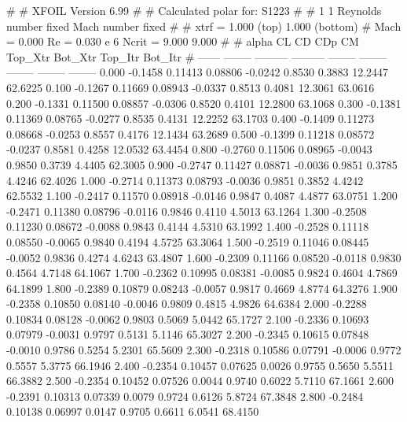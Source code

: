 #  
#       XFOIL         Version 6.99
#  
# Calculated polar for: S1223                                           
#  
# 1 1 Reynolds number fixed          Mach number fixed         
#  
# xtrf =   1.000 (top)        1.000 (bottom)  
# Mach =   0.000     Re =     0.030 e 6     Ncrit =   9.000  9.000
#  
#   alpha    CL        CD       CDp       CM     Top_Xtr  Bot_Xtr  Top_Itr  Bot_Itr
#  ------ -------- --------- --------- -------- -------- -------- -------- --------
   0.000  -0.1458   0.11413   0.08806  -0.0242   0.8530   0.3883  12.2447  62.6225
   0.100  -0.1267   0.11669   0.08943  -0.0337   0.8513   0.4081  12.3061  63.0616
   0.200  -0.1331   0.11500   0.08857  -0.0306   0.8520   0.4101  12.2800  63.1068
   0.300  -0.1381   0.11369   0.08765  -0.0277   0.8535   0.4131  12.2252  63.1703
   0.400  -0.1409   0.11273   0.08668  -0.0253   0.8557   0.4176  12.1434  63.2689
   0.500  -0.1399   0.11218   0.08572  -0.0237   0.8581   0.4258  12.0532  63.4454
   0.800  -0.2760   0.11506   0.08965  -0.0043   0.9850   0.3739   4.4405  62.3005
   0.900  -0.2747   0.11427   0.08871  -0.0036   0.9851   0.3785   4.4246  62.4026
   1.000  -0.2714   0.11373   0.08793  -0.0036   0.9851   0.3852   4.4242  62.5532
   1.100  -0.2417   0.11570   0.08918  -0.0146   0.9847   0.4087   4.4877  63.0751
   1.200  -0.2471   0.11380   0.08796  -0.0116   0.9846   0.4110   4.5013  63.1264
   1.300  -0.2508   0.11230   0.08672  -0.0088   0.9843   0.4144   4.5310  63.1992
   1.400  -0.2528   0.11118   0.08550  -0.0065   0.9840   0.4194   4.5725  63.3064
   1.500  -0.2519   0.11046   0.08445  -0.0052   0.9836   0.4274   4.6243  63.4807
   1.600  -0.2309   0.11166   0.08520  -0.0118   0.9830   0.4564   4.7148  64.1067
   1.700  -0.2362   0.10995   0.08381  -0.0085   0.9824   0.4604   4.7869  64.1899
   1.800  -0.2389   0.10879   0.08243  -0.0057   0.9817   0.4669   4.8774  64.3276
   1.900  -0.2358   0.10850   0.08140  -0.0046   0.9809   0.4815   4.9826  64.6384
   2.000  -0.2288   0.10834   0.08128  -0.0062   0.9803   0.5069   5.0442  65.1727
   2.100  -0.2336   0.10693   0.07979  -0.0031   0.9797   0.5131   5.1146  65.3027
   2.200  -0.2345   0.10615   0.07848  -0.0010   0.9786   0.5254   5.2301  65.5609
   2.300  -0.2318   0.10586   0.07791  -0.0006   0.9772   0.5557   5.3775  66.1946
   2.400  -0.2354   0.10457   0.07625   0.0026   0.9755   0.5650   5.5511  66.3882
   2.500  -0.2354   0.10452   0.07526   0.0044   0.9740   0.6022   5.7110  67.1661
   2.600  -0.2391   0.10313   0.07339   0.0079   0.9724   0.6126   5.8724  67.3848
   2.800  -0.2484   0.10138   0.06997   0.0147   0.9705   0.6611   6.0541  68.4150
